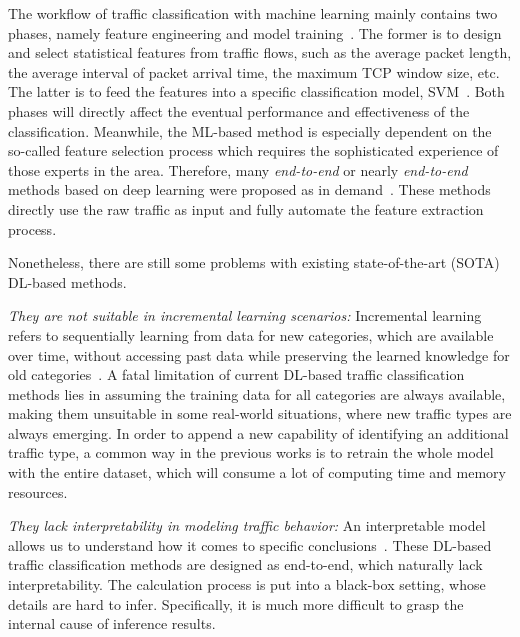 The workflow of traffic classification with machine learning mainly contains two phases, namely feature engineering and model training~\cite{wang2017end}. 
The former is to design and select statistical features from traffic flows, such as the average packet length, the average interval of packet arrival time, the maximum TCP window size, etc.
The latter is to feed the features into a specific classification model, \eg SVM~\cite{platt1998sequential}. 
Both phases will directly affect the eventual performance and effectiveness of the classification.
Meanwhile,  the ML-based method is especially dependent on the so-called feature selection process which requires the sophisticated experience of those experts in the area.
Therefore, many \emph{end-to-end} or nearly \emph{end-to-end} methods based on deep learning were proposed as in demand~\cite{zheng2020learning, chen2017seq2img}. %
These methods directly use the raw traffic as input and fully automate the feature extraction process.

Nonetheless, there are still some problems with existing state-of-the-art (SOTA) DL-based methods. 

\first \textit{They are not suitable in incremental learning scenarios: } 
Incremental learning refers to sequentially learning from data for new categories, which are available over time, without accessing past data while preserving the learned knowledge for old categories~\cite{cui2021deepcollaboration}. 
A fatal limitation of current DL-based traffic classification methods lies in assuming the training data for all categories are always available, making them unsuitable in some real-world situations, where new traffic types are always emerging.
In order to append a new capability of identifying an additional traffic type, a common way in the previous works is to retrain the whole model with the entire dataset, which will consume a lot of computing time and memory resources.

\second \textit{They lack interpretability in modeling traffic behavior: }
An interpretable model allows us to understand how it comes to specific conclusions~\cite{fan2020can}.   %
These DL-based traffic classification methods are designed as end-to-end, which naturally lack interpretability. 
The calculation process is put into a black-box setting, whose details are hard to infer.
Specifically, it is much more difficult to grasp the internal cause of inference results. 

